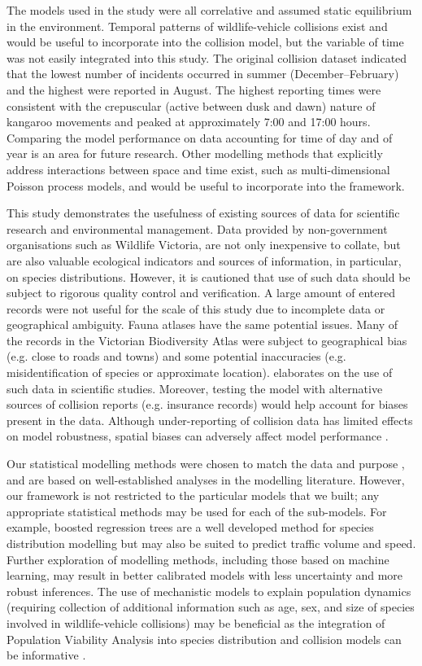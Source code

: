 The models used in the study were all correlative and assumed static equilibrium in the environment. Temporal patterns of wildlife-vehicle collisions exist and would be useful to incorporate into the collision model, but the variable of time was not easily integrated into this study. The original collision dataset indicated that the lowest number of incidents occurred in summer (December--February) and the highest were reported in August. The highest reporting times were consistent with the crepuscular (active between dusk and dawn) nature of kangaroo movements \citep{mccu00} and peaked at approximately 7:00 and 17:00 hours. Comparing the model performance on data accounting for time of day and of year is an area for future research. Other modelling methods that explicitly address interactions between space and time exist, such as multi-dimensional Poisson process models, and would be useful to incorporate into the framework.

This study demonstrates the usefulness of existing sources of data for scientific research and environmental management. Data provided by non-government organisations such as Wildlife Victoria, are not only inexpensive to collate, but are also valuable ecological indicators and sources of information, in particular, on species distributions. However, it is cautioned that use of such data should be subject to rigorous quality control and verification. A large amount of entered records were not useful for the scale of this study due to incomplete data or geographical ambiguity. Fauna atlases have the same potential issues. Many of the records in the Victorian Biodiversity Atlas were subject to geographical bias (e.g. close to roads and towns) and some potential inaccuracies (e.g. misidentification of species or approximate location). \cite{grah04} elaborates on the use of such data in scientific studies. Moreover, testing the model with alternative sources of collision reports (e.g. insurance records) would help account for biases present in the data. Although under-reporting of collision data has limited effects on model robustness, spatial biases can adversely affect model performance \citep{snow15}.

Our statistical modelling methods were chosen to match the data and purpose \citep[see][]{wint05,guil15}, and are based on well-established analyses in the modelling literature. However, our framework is not restricted to the particular models that we built; any appropriate statistical methods may be used for each of the sub-models. For example, boosted regression trees are a well developed method for species distribution modelling \citep{elit08} but may also be suited to predict traffic volume and speed. Further exploration of modelling methods, including those based on machine learning, may result in better calibrated models with less uncertainty and more robust inferences. The use of mechanistic models to explain population dynamics (requiring collection of additional information such as age, sex, and size of species involved in wildlife-vehicle collisions) may be beneficial as the integration of Population Viability Analysis into species distribution and collision models can be informative \citep[see][]{tyre01,elit10,pola14}.

